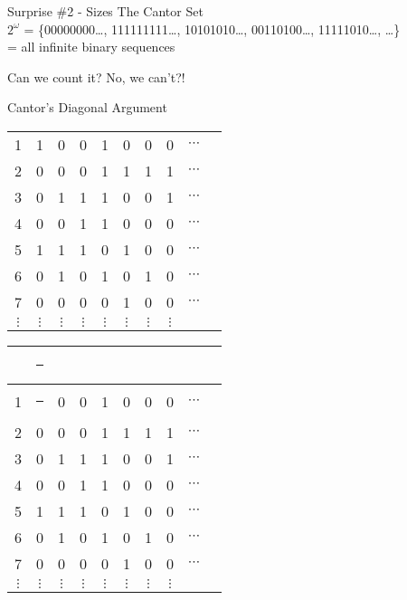 \documentclass[compress,17pt]{beamer}
\newcommand\hl{\bgroup\markoverwith
    {\textcolor{yellow}{\rule[-.5ex]{.1pt}{2.5ex}}}\ULon}
\begin{document}
\begin{frame}{Surprise \#2 - Sizes}
  The Cantor Set \\
  $2^\omega$ = \{00000000\dots, 111111111\dots, 10101010\dots, 00110100\dots, 11111010\dots, \dots\}\\
  = {all infinite binary sequences} \\ \pause
  \vphantom{text}

  Can we count it? \pause No, we can't?!
\end{frame}

\begin{frame}[standout]
  \large
  Cantor's Diagonal Argument
\end{frame}

\begin{frame}
  \begin{tabular}{ | c | c c c c c c c c c }
    \hline
    &  \\
    \hline

    1 & 1 & 0 & 0 & 1 & 0 & 0 & 0 & $\cdots$\\
    2 & 0 & 0 & 0 & 1 & 1 & 1 & 1 & $\cdots$\\
    3 & 0 & 1 & 1 & 1 & 0 & 0 & 1 & $\cdots$\\
    4 & 0 & 0 & 1 & 1 & 0 & 0 & 0 & $\cdots$\\
    5 & 1 & 1 & 1 & 0 & 1 & 0 & 0 & $\cdots$\\
    6 & 0 & 1 & 0 & 1 & 0 & 1 & 0 & $\cdots$\\
    7 & 0 & 0 & 0 & 0 & 1 & 0 & 0 & $\cdots$\\
    $\vdots$ & $\vdots$ & $\vdots$ & $\vdots$ & $\vdots$ & $\vdots$ & $\vdots$ & $\vdots$ & \\
  \end{tabular}
\end{frame}

\begin{frame}
  \begin{tabular}{ | c | c c c c c c c c c }
    \hline
    &  \hl 0 \\
    \hline

    1 & \hl 1 & 0 & 0 & 1 & 0 & 0 & 0 & $\cdots$\\
    2 & 0 & 0 & 0 & 1 & 1 & 1 & 1 & $\cdots$\\
    3 & 0 & 1 & 1 & 1 & 0 & 0 & 1 & $\cdots$\\
    4 & 0 & 0 & 1 & 1 & 0 & 0 & 0 & $\cdots$\\
    5 & 1 & 1 & 1 & 0 & 1 & 0 & 0 & $\cdots$\\
    6 & 0 & 1 & 0 & 1 & 0 & 1 & 0 & $\cdots$\\
    7 & 0 & 0 & 0 & 0 & 1 & 0 & 0 & $\cdots$\\
    $\vdots$ & $\vdots$ & $\vdots$ & $\vdots$ & $\vdots$ & $\vdots$ & $\vdots$ & $\vdots$ & \\
  \end{tabular}
\end{frame}
\end{document}

